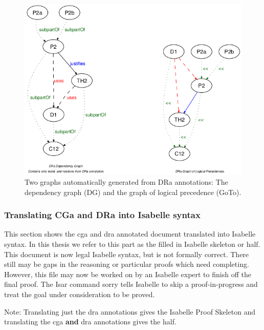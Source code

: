 \begin{figure}[H]
\begin{center}
\includegraphics[scale=0.6]{Figures/Background/depandgoto.png}
\end{center}
\caption{{Two graphs automatically generated from DRa annotations:
The dependency graph (DG) and the graph of logical precedence (GoTo)}.
 \label{fig:depandgoto}}
\end{figure}

\subsubsection{Translating CGa and DRa into Isabelle syntax}

This section shows the \gls{cga} and \gls{dra} annotated document translated into Isabelle syntax. In this thesis we refer to this part as the filled in Isabelle skeleton or \gls{half}. This document is now legal Isabelle syntax, but is not formally correct. There still may be gaps in the reasoning or particular proofs which need completing. However, this file may now be worked on by an Isabelle expert to finish off the final proof. The Isar command sorry tells Isabelle to skip a proof-in-progress and treat the goal under consideration to be proved.

Note: Translating just the \gls{dra} annotations gives the Isabelle Proof Skeleton and translating the \gls{cga} \textbf{and} \gls{dra} annotations gives the \gls{half}.

